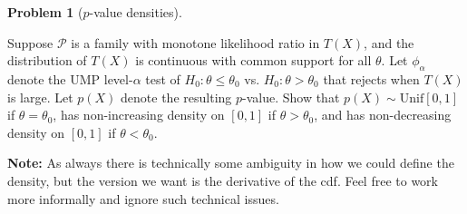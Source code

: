 \documentclass{article}
\newcommand{\cP}{\mathcal{P}}
\theoremstyle{definition}
\newtheorem{problem}{Problem}
\begin{document}
\begin{problem}[$p$-value densities]
\label{prob:pval-densities}

Suppose $\cP$ is a family with monotone likelihood ratio in $T(X)$, and the distribution of $T(X)$ is continuous with common support for all $\theta$. Let $\phi_{\alpha}$ denote the UMP level-$\alpha$ test of $H_0:\theta\leq \theta_0$ vs. $H_0:\theta > \theta_0$ that rejects when $T(X)$ is large. Let $p(X)$ denote the resulting $p$-value. Show that $p(X)\sim \text{Unif}[0,1]$ if $\theta=\theta_0$, has non-increasing density on $[0,1]$ if $\theta>\theta_0$, and has non-decreasing density on $[0,1]$ if $\theta<\theta_0$.

{\bf Note:} As always there is technically some ambiguity in how we could define the density, but the version we want is the derivative of the cdf. Feel free to work more informally and ignore such technical issues.


\end{problem}



\end{document}
